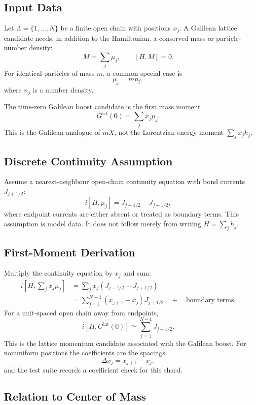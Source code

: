 \subsection{Input Data}

Let \(\Lambda=\{1,\ldots,N\}\) be a finite open chain with positions \(x_j\).
A Galilean lattice candidate needs, in addition to the Hamiltonian, a conserved
mass or particle-number density:
\[
  M=\sum_j \mu_j,
  \qquad
  [H,M]=0.
\]
For identical particles of mass \(m\), a common special case is
\[
  \mu_j=m n_j,
\]
where \(n_j\) is a number density.

The time-zero Galilean boost candidate is the first mass moment
\[
  G^{\mathrm{lat}}(0)=\sum_j x_j\mu_j.
\]
This is the Galilean analogue of \(mX\), not the Lorentzian energy moment
\(\sum_j x_jh_j\).

\subsection{Discrete Continuity Assumption}

Assume a nearest-neighbour open-chain continuity equation with bond currents
\(J_{j+1/2}\):
\[
  i[H,\mu_j]=J_{j-1/2}-J_{j+1/2},
\]
where endpoint currents are either absent or treated as boundary terms.  This
assumption is model data.  It does not follow merely from writing
\(H=\sum_jh_j\).

\subsection{First-Moment Derivation}

Multiply the continuity equation by \(x_j\) and sum:
\[
\begin{aligned}
  i\left[H,\sum_j x_j\mu_j\right]
  &=
    \sum_j x_j(J_{j-1/2}-J_{j+1/2})\\
  &=
    \sum_{j=1}^{N-1}(x_{j+1}-x_j)J_{j+1/2}
    \quad+\quad\text{boundary terms}.
\end{aligned}
\]
For a unit-spaced open chain away from endpoints,
\[
  i[H,G^{\mathrm{lat}}(0)]
  \simeq
  \sum_{j=1}^{N-1}J_{j+1/2}.
\]
This is the lattice momentum candidate associated with the Galilean boost.
For nonuniform positions the coefficients are the spacings
\[
  \Delta x_j=x_{j+1}-x_j,
\]
and the test suite records a coefficient check for this shard.

\subsection{Relation to Center of Mass}

